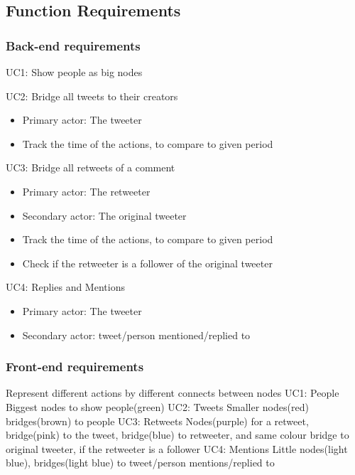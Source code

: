 \documentclass[11pt]{article}
\begin{document}
\subsection{Function Requirements}
\subsubsection{Back-end requirements}
UC1: Show people as big nodes


UC2: Bridge all tweets to their creators
\begin{itemize}
\item Primary actor: The tweeter
\item Track the time of the actions, to compare to given period
\end{itemize}

UC3: Bridge all retweets of a comment
\begin{itemize}
\item Primary actor: The retweeter
\item Secondary actor: The original tweeter
\item Track the time of the actions, to compare to given period
\item Check if the retweeter is a follower of the original tweeter
\end{itemize}

UC4: Replies and Mentions
\begin{itemize}
\item Primary actor: The tweeter
\item Secondary actor: tweet/person mentioned/replied to
\end{itemize}

\subsubsection{Front-end requirements}
Represent different actions by different connects between nodes
\break \newline
UC1: People\newline
Biggest nodes to show people(green)\newline
\break
\newline
UC2: Tweets\newline
Smaller nodes(red) bridges(brown) to people\newline
\break
UC3: Retweets\newline
Nodes(purple) for a retweet, bridge(pink) to the tweet, bridge(blue) to retweeter, and same colour bridge to original tweeter, if the retweeter is a follower\newline
\break
UC4: Mentions\newline
Little nodes(light blue), bridges(light blue) to tweet/person mentions/replied to
\end{document}
